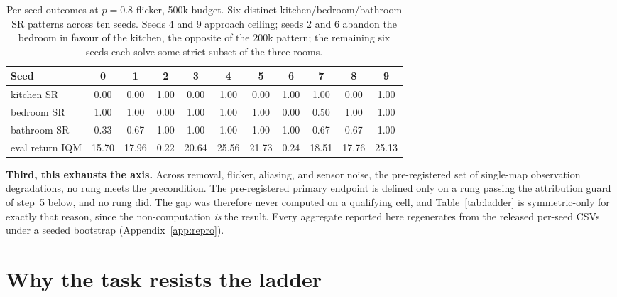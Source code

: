\documentclass{article}
\begin{document}
\begin{table}[t]
\caption{Per-seed outcomes at $p=0.8$ flicker, 500k budget. Six distinct
kitchen/bedroom/bathroom SR patterns across ten seeds. Seeds 4 and 9 approach ceiling; seeds
2 and 6 abandon the bedroom in favour of the kitchen, the opposite of the 200k pattern; the
remaining six seeds each solve some strict subset of the three rooms.}
\label{tab:perseed}
\centering
\small
\setlength{\tabcolsep}{5pt}
\begin{tabular}{lcccccccccc}
\toprule
Seed & 0 & 1 & 2 & 3 & 4 & 5 & 6 & 7 & 8 & 9 \\
\midrule
kitchen SR  & 0.00 & 0.00 & 1.00 & 0.00 & 1.00 & 0.00 & 1.00 & 1.00 & 0.00 & 1.00 \\
bedroom SR  & 1.00 & 1.00 & 0.00 & 1.00 & 1.00 & 1.00 & 0.00 & 0.50 & 1.00 & 1.00 \\
bathroom SR & 0.33 & 0.67 & 1.00 & 1.00 & 1.00 & 1.00 & 1.00 & 0.67 & 0.67 & 1.00 \\
eval return IQM & 15.70 & 17.96 & 0.22 & 20.64 & 25.56 & 21.73 & 0.24 & 18.51 & 17.76 & 25.13 \\
\bottomrule
\end{tabular}
\end{table}

\textbf{Third, this exhausts the axis.} Across removal, flicker, aliasing, and sensor noise,
the pre-registered set of single-map observation degradations, no rung meets the precondition.
The pre-registered primary endpoint is defined only on a rung passing the attribution guard of
step~5 below, and no rung did. The gap was therefore never computed on a qualifying cell, and
Table~\ref{tab:ladder} is symmetric-only for exactly that reason, since the non-computation
\emph{is} the result. Every aggregate reported here regenerates from the released
per-seed CSVs under a seeded bootstrap (Appendix~\ref{app:repro}).

\section{Why the task resists the ladder}
\label{sec:why}
\end{document}
